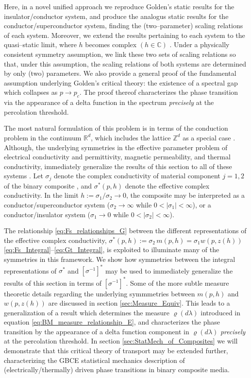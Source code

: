 \documentclass[english,12pt]{ttuthes}
\begin{document}
Here, in a novel unified approach we reproduce Golden's static
results for the insulator/conductor system, and produce the analogus
static results for the conductor/superconductor system, finding the
(two--parameter) scaling relations of each system. Moreover, we extend
the results pertaining to each system to the quasi--static limit,
where $h$ becomes complex $(h\in\mathbb{C})$
\cite{Jackson-1999,Efros:PSSB-303}. Under a physically consistent
\cite{Efros:PSSB-303} symmetry assumption, we link these two sets of
scaling relations so that, under this assumption, the scaling
relations of both systems are determined by only (two) parameters. We
also provide a general proof of the fundamental assumption underlying
Golden's critical theory: the existence of a spectral gap which
collapses as $p\to p_c$. The proof thereof characterizes the phase
transition via the appearance of a delta function in the spectrum
\emph{precisely} at the percolation threshold.          

The most natural formulation of this problem is in terms of the
conduction problem in the continuum $\mathbb{R}^d$, which includes the
lattice $\mathbb{Z}^d$ as a special case
\cite{Golden:JMP-5627,Golden:CMP-473}. Although, the underlying
symmetries in the effective parameter problem of electrical
conductivity and permittivity, magnetic permeability, and thermal 
conductivity, immediately generalize the results of this section to
all of these systems \cite{MILTON:2002:TC}. Let $\sigma_j$ denote the
complex conductivity of material component $j=1,2$ of the binary
composite \cite{Efros:PSSB-303}, and $\sigma^*(p,h)$ denote the effective
complex conductivity. In the limit $h:=\sigma_1/\sigma_2\to0$, the composite may  
be interpreted as a conductor/superconductor system ($\sigma_2\to\infty$ while
$0<|\sigma_1|<\infty$), or a conductor/insulator system ($\sigma_1\to0$ while
$0<|\sigma_2|<\infty$). 

The relationship \eqref{eq:Fs_relationships_G} between the different 
representations of the effective complex conductivity,
$\sigma^*(p,h):=\sigma_2\,m(p,h)=\sigma_1w(p,z(h))$
\eqref{eq:Fs_Integral}--\eqref{eq:Gt_Integral}, is exploited to
illuminate many of the symmetries in this framework. We show how 
symmetries between the integral representations of $\sigma^*$ and
$[\sigma^{-1}]^*$ may be used to immediately generalize the results of
this section in terms of $[\sigma^{-1}]^*$. Some of the more subtle measure
theoretic details regarding the underlying symmmetries between
$m(p,h)$ and $w(p,z(h))$ are discussed in section
\ref{sec:Measure_Equiv}. This leads to a generalization of a result
\cite{Day:JPCM-96} which determines the measure $\varrho(d\lambda)$ introduced in
equation \eqref{eq:BM_measure_relationship_E}, and characterizes the
phase transition by the appearance of a delta function component in
$\varrho(d\lambda)$ \emph{precisely} at the percolation threshold. In section
\ref{sec:StatMech_of_Composites} we will demonstrate that this
critical theory of transport may be extended further, characterizing 
the GBCE statistical mechanics description of (electrically/thermally)
driven phase transitions in binary composite media.           
%
\end{document}
